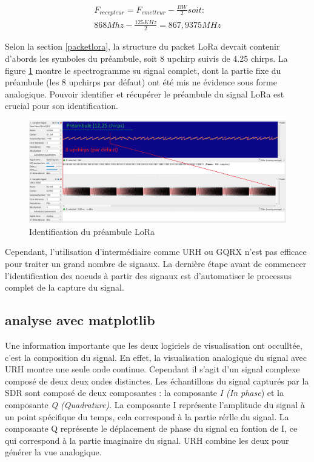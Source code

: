 \begin{align}
    F_{recepteur} = F_{emetteur} - \frac{BW}{2} soit: \\
    868Mhz - \frac{125KHz}{2} = 867,9375MHz
\end{align}

\newpage

Selon la section \ref{packetlora}, la structure du packet LoRa devrait contenir d'abords les symboles du préambule, soit 8 upchirp suivis de 4.25 chirps. La figure \ref{term308} montre le spectrogramme su signal complet, dont la partie fixe du préambule (les 8 upchirps par défaut) ont été mis ne évidence sous forme analogique. Pouvoir identifier et récupérer le préambule du signal LoRa est crucial pour son identification. 


\begin{figure}[h]
\centering

\includegraphics[width=\textwidth]{images/urh6.png}
\caption{Identification du préambule LoRa}\label{term308}
\end{figure}

Cependant, l'utilisation d'intermédiaire comme URH ou GQRX n'est pas efficace pour traiter un grand nombre de signaux. La dernière étape avant de commencer l'identification des noeuds à partir des signaux est d'automatiser le processus complet de la capture du signal.

\newpage

\subsection{analyse avec matplotlib}

Une information importante que les deux logiciels de visualisation ont occulltée, c'est la composition du signal. En effet, la visualisation analogique du signal avec URH montre une seule onde continue. Cependant il s'agit d'un signal complexe composé de deux deux ondes distinctes. Les échantillons du signal capturés par la SDR sont composé de deux composantes : la composante \textit{I (In phase}) et la composante \textit{Q (Quadrature)}. La composante I représente l'amplitude du signal à un point spécifique du temps, cela correspond à la partie rérlle du signal. La composante Q représente le déplacement de phase du signal en fontion de I, ce qui correspond à la partie imaginaire du signal. URH combine les deux pour générer la vue analogique.


